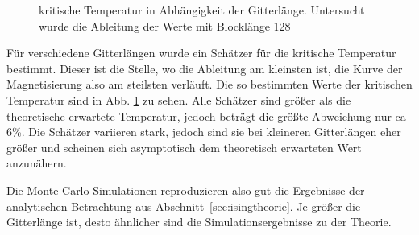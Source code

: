 	\begin{figure}[htbp]
		
		\caption[kritische Temperatur in Abhängigkeit der Gitterlänge]{kritische Temperatur in Abhängigkeit der Gitterlänge. Untersucht wurde die Ableitung der Werte mit Blocklänge 128}
		\label{fig:tkritlaenge}
	\end{figure}
	
	Für verschiedene Gitterlängen wurde ein Schätzer für die kritische Temperatur bestimmt. Dieser ist die Stelle, wo die Ableitung am kleinsten ist, die Kurve der Magnetisierung also am steilsten verläuft. Die so bestimmten Werte der kritischen Temperatur sind in Abb. \ref{fig:tkritlaenge} zu sehen. Alle Schätzer sind größer als die theoretische erwartete Temperatur, jedoch beträgt die größte Abweichung nur ca 6\%. Die Schätzer variieren stark, jedoch sind sie bei kleineren Gitterlängen eher größer und scheinen sich asymptotisch dem theoretisch erwarteten Wert anzunähern.
	
	Die Monte-Carlo-Simulationen reproduzieren also gut die Ergebnisse der analytischen Betrachtung aus Abschnitt~\ref{sec:isingtheorie}. Je größer die Gitterlänge ist, desto ähnlicher sind die Simulationsergebnisse zu der Theorie.
	
	
%	
%			
%			
%			
	
